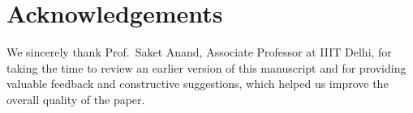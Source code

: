\section*{Acknowledgements}

We sincerely thank Prof.~Saket Anand, Associate Professor at IIIT Delhi, for taking the time to review an earlier version of this manuscript and for providing valuable feedback and constructive suggestions, which helped us improve the overall quality of the paper.


